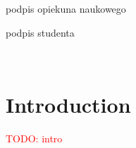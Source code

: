 \documentclass[11pt,a4paper,twoside]{book}
\numberwithin{equation}{chapter}
\newcommand{\todo}[1]{\textcolor{red}{TODO: #1}}
\begin{document}
\vfill

\begin{multicols}{2}
	\begin{flushleft}
		podpis opiekuna naukowego
	\end{flushleft}
	\begin{flushright}
		podpis studenta
	\end{flushright}
\end{multicols}

\newpage
\mbox{ }

\tableofcontents
{}
\pagestyle{empty}

\chapter{Introduction}
\pagestyle{fancy}

\todo{intro}




\listoffigures
\listoftables

\appendix
\end{document}

